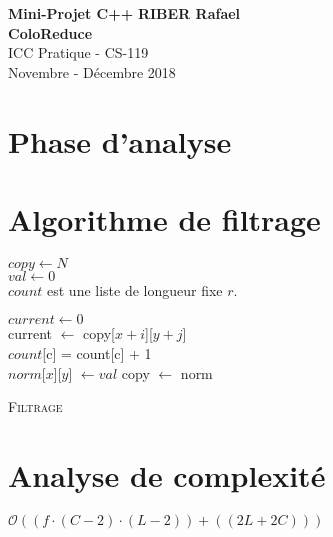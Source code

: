 \documentclass[a4paper, 11pt]{article}
\begin{document}
\noindent
\large\textbf{Mini-Projet C++} \hfill \textbf{RIBER Rafael} \\
\large\textbf{ColoReduce}\\
\normalsize ICC Pratique - CS-119\\
\hfill Novembre - Décembre 2018

\section*{Phase d'analyse}

\section*{Algorithme de filtrage}

\begin{algorithm}[H]
\SetSideCommentLeft
    $copy \gets N$\\
    $val \gets 0$\\
    $count$ est une liste de longueur fixe $r$.
    
      {
      	  {
      	    {
    			$current \gets 0$\\
   				  {
   				  	  {
   				  	  	  {
   				  	  	    current $\gets$ copy[$x + i$][$y + j$]\\
   				  	  	  	  {
   				  	  	  	  		{
   				  	  	  	  			$count$[c] = count[c] + 1\\
   				  	  	  	  			  {
   				  	  	  	  			  }
   				  	  	  	  		}
   				  	  	  	  }
   				  	  	  }
   				  	  }
   				  }
             $norm$[$x$][$y$] $\gets val$
      	    }
      	  }
      	  copy $\gets$ norm
        }
      {
      }
      
\caption{ \textsc{Filtrage}}
\end{algorithm}

\section*{Analyse de complexité}
$\mathcal{O}((f \cdot (C-2) \cdot (L-2)) + ((2L + 2C)))$
\end{document}
